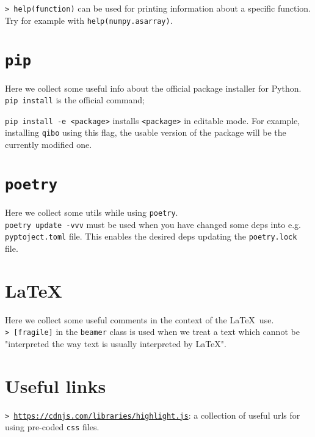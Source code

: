 \documentclass[11pt]{article}
\newcommand{\cmd}[1]{\colorbox{light-gray}{\textcolor{gio}{\texttt{#1}}}}
\begin{document}
\begin{multicols}{2}
\cmd{> help(function)} can be used for printing information about a specific 
function.
Try for example with \texttt{help(numpy.asarray)}.

\section{\texttt{pip}}

Here we collect some useful info about the official  package installer for Python. \\

\cmd{pip install} is the official command;

\cmd{pip install -e <package>} installs \texttt{<package>} in editable mode. 
For example, installing \texttt{qibo} using this flag, the usable version of the 
package will be the currently modified one.

\section{\texttt{poetry}}

Here we collect some utils while using \texttt{poetry}. \\

\cmd{poetry update -vvv} must be used when you have changed some deps into e.g. 
\texttt{pyptoject.toml} file. This enables the desired deps updating the 
\texttt{poetry.lock} file.

\section{\LaTeX}

Here we collect some useful comments in the context of the \LaTeX$\,$ use. \\

\cmd{> [fragile]} in the \texttt{beamer} class is used when we treat a text which 
cannot be "interpreted the way text is usually interpreted by \LaTeX".


\newpage

\section*{Useful links}

\cmd{> \href{https://cdnjs.com/libraries/highlight.js}{https://cdnjs.com/libraries/highlight.js}}:
 a collection of useful urls for using pre-coded \texttt{css} files.

\newpage
\end{multicols}
\end{document}
